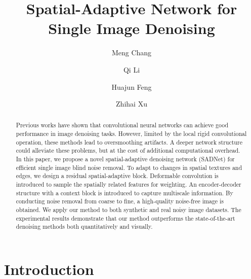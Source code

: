\documentclass[runningheads]{llncs}
\begin{document}
\pagestyle{headings}
\mainmatter
\def\ECCVSubNumber{7202}  

\title{Spatial-Adaptive Network for Single Image Denoising} 

\begin{comment}
\titlerunning{ECCV-20 submission ID \ECCVSubNumber} 
\authorrunning{ECCV-20 submission ID \ECCVSubNumber} 
\author{Anonymous ECCV submission}
\institute{Paper ID \ECCVSubNumber}
\end{comment}


\author{Meng Chang \and
Qi Li \and
Huajun Feng \and
Zhihai Xu}
\maketitle

\begin{abstract}
   Previous works have shown that convolutional neural networks can achieve good performance in image denoising tasks. However, limited by the local rigid convolutional operation, these methods lead to oversmoothing artifacts. A deeper network structure could alleviate these problems, but at the cost of additional computational overhead. In this paper, we propose a novel spatial-adaptive denoising network (SADNet) for efficient single image blind noise removal. To adapt to changes in spatial textures and edges, we design a residual spatial-adaptive block. Deformable convolution is introduced to sample the spatially related features for weighting. An encoder-decoder structure with a context block is introduced to capture multiscale information. By conducting noise removal from coarse to fine, a high-quality noise-free image is obtained. We apply our method to both synthetic and real noisy image datasets. The experimental results demonstrate that our method outperforms the state-of-the-art denoising methods both quantitatively and visually.
\end{abstract}


\section{Introduction}
\end{document}
